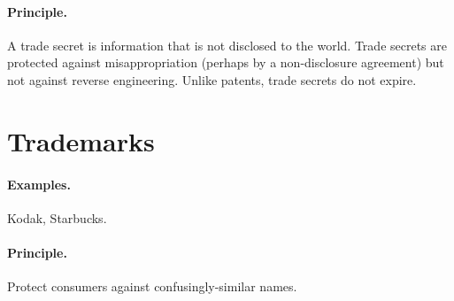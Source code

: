 \documentclass[11pt]{article}
\begin{document}
\paragraph{Principle.} A trade secret is information that is not disclosed to the world.
Trade secrets are protected against misappropriation (perhaps by a non-disclosure agreement)
but not against reverse engineering. Unlike patents, trade secrets do not expire.

\section*{Trademarks}
\paragraph{Examples.} Kodak, Starbucks.

\paragraph{Principle.} Protect consumers against confusingly-similar names.
\end{document}
